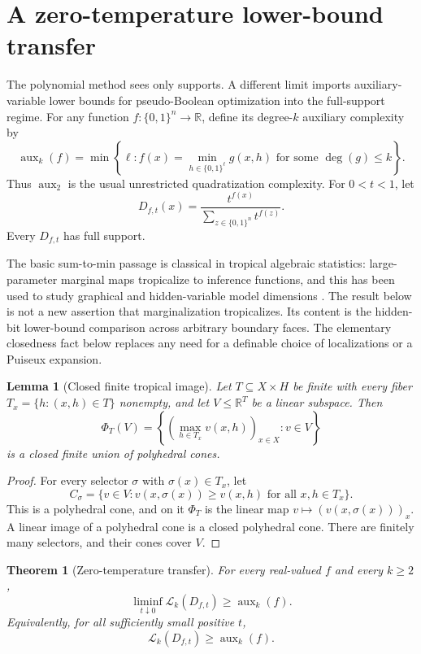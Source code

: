 \documentclass{article}
\newcommand{\LC}{\mathcal{L}}
\newcommand{\bits}{\{0,1\}}
\newtheorem{theorem}{Theorem}
\newtheorem{lemma}{Lemma}
\begin{document}
\section{A zero-temperature lower-bound transfer}
\label{sec:zero-temperature}

The polynomial method sees only supports.  A different limit imports
auxiliary-variable lower bounds for pseudo-Boolean optimization into the
full-support regime.  For any function $f:\bits^n\to\mathbb R$, define its
degree-$k$ auxiliary complexity by
\[
  \operatorname{aux}_k(f)
  =\min\left\{\ell:
  f(x)=\min_{h\in\bits^\ell}g(x,h)
  \text{ for some }\deg(g)\le k\right\}.
\]
Thus $\operatorname{aux}_2$ is the usual unrestricted quadratization
complexity.  For $0<t<1$, let
\[
  D_{f,t}(x)=\frac{t^{f(x)}}{\sum_{z\in\bits^n}t^{f(z)}}.
\]
Every $D_{f,t}$ has full support.

The basic sum-to-min passage is classical in tropical algebraic statistics:
large-parameter marginal maps tropicalize to inference functions, and this has
been used to study graphical and hidden-variable model dimensions
\cite{pachtersturmfels04,cuetomortonsturmfels10,montufarmorton17}.  The result
below is not a new assertion that marginalization tropicalizes.  Its content is
the hidden-bit lower-bound comparison across arbitrary boundary faces.  The
elementary closedness fact below replaces any need for a definable choice of
localizations or a Puiseux expansion.

\begin{lemma}[Closed finite tropical image]
\label{lem:closed-tropical-image}
Let $T\subseteq X\times H$ be finite with every fiber
$T_x=\{h:(x,h)\in T\}$ nonempty, and let $V\le\mathbb R^T$ be a linear
subspace.  Then
\[
  \Phi_T(V)=
  \left\{
    \left(\max_{h\in T_x}v(x,h)\right)_{x\in X}:v\in V
  \right\}
\]
is a closed finite union of polyhedral cones.
\end{lemma}

\begin{proof}
For every selector $\sigma$ with $\sigma(x)\in T_x$, let
\[
  C_\sigma=
  \{v\in V:v(x,\sigma(x))\ge v(x,h)\text{ for all }x,h\in T_x\}.
\]
This is a polyhedral cone, and on it $\Phi_T$ is the linear map
$v\mapsto(v(x,\sigma(x)))_x$.  A linear image of a polyhedral cone is a
closed polyhedral cone.  There are finitely many selectors, and their cones
cover $V$.
\end{proof}

\begin{theorem}[Zero-temperature transfer]
\label{thm:zero-temperature}
For every real-valued $f$ and every $k\ge2$,
\[
  \liminf_{t\downarrow0}\LC_k(D_{f,t})
  \ge \operatorname{aux}_k(f).
\]
Equivalently, for all sufficiently small positive $t$,
\[
  \LC_k(D_{f,t})\ge\operatorname{aux}_k(f).
\]
\end{theorem}
\end{document}
